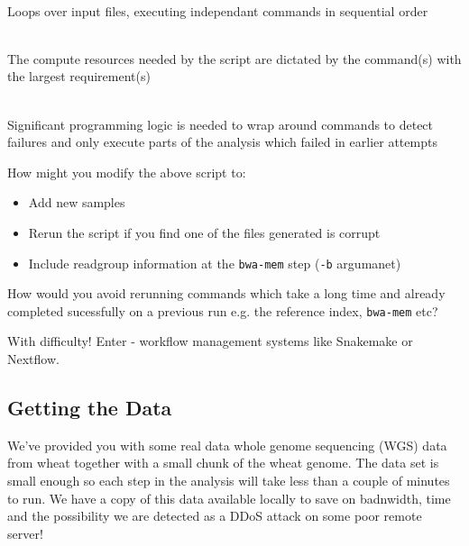 \begin{description}[style=multiline,labelindent=0cm,align=left,leftmargin=0.5cm]
  \item[Not parallelised]\hfill\\
    Loops over input files, executing independant commands in sequential order
  \item[Resources over-specified]\hfill\\
    The compute resources needed by the script are dictated by the command(s) with the largest requirement(s)
  \item[Not idempotent]\hfill\\
    Significant programming logic is needed to wrap around commands to detect failures and only execute parts of the analysis which failed in earlier attempts
\end{description}

\begin{questions}

How might you modify the above script to:

\begin{itemize}
  \item Add new samples
  \item Rerun the script if you find one of the files generated is corrupt
  \item Include readgroup information at the \texttt{bwa-mem} step (\texttt{-b} argumanet)
\end{itemize}

How would you avoid rerunning commands which take a long time and already completed sucessfully
on a previous run e.g. the reference index, \texttt{bwa-mem} etc?

\begin{answer}

With difficulty!
Enter - workflow management systems like Snakemake or Nextflow.

\end{answer}

\end{questions}

\subsection{Getting the Data}

We've provided you with some real data whole genome sequencing (WGS) data from wheat together with a small chunk of the wheat genome.
The data set is small enough so each step in the analysis will take less than a couple of minutes to run. We have a copy of this data
available locally to save on badnwidth, time and the possibility we are detected as a DDoS attack on some poor remote server!

